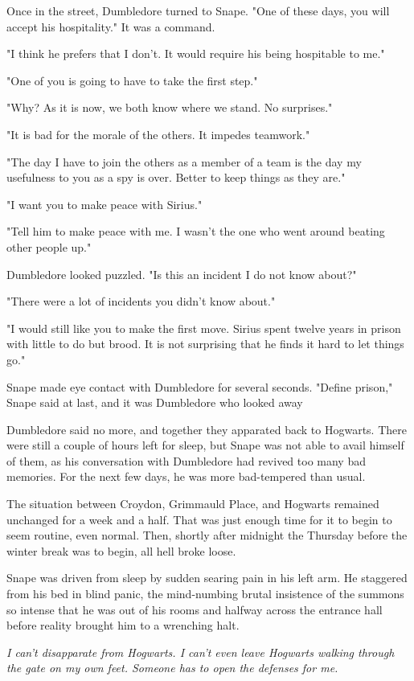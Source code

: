 Once in the street, Dumbledore turned to Snape. "One of these days, you will accept his hospitality." It was a command.

"I think he prefers that I don't. It would require his being hospitable to me."

"One of you is going to have to take the first step."

"Why? As it is now, we both know where we stand. No surprises."

"It is bad for the morale of the others. It impedes teamwork."

"The day I have to join the others as a member of a team is the day my usefulness to you as a spy is over. Better to keep things as they are."

"I want you to make peace with Sirius."

"Tell him to make peace with me. I wasn't the one who went around beating other people up."

Dumbledore looked puzzled. "Is this an incident I do not know about?"

"There were a lot of incidents you didn't know about."

"I would still like you to make the first move. Sirius spent twelve years in prison with little to do but brood. It is not surprising that he finds it hard to let things go."

Snape made eye contact with Dumbledore for several seconds. "Define prison," Snape said at last, and it was Dumbledore who looked away

Dumbledore said no more, and together they apparated back to Hogwarts. There were still a couple of hours left for sleep, but Snape was not able to avail himself of them, as his conversation with Dumbledore had revived too many bad memories. For the next few days, he was more bad-tempered than usual.

The situation between Croydon, Grimmauld Place, and Hogwarts remained unchanged for a week and a half. That was just enough time for it to begin to seem routine, even normal. Then, shortly after midnight the Thursday before the winter break was to begin, all hell broke loose.

Snape was driven from sleep by sudden searing pain in his left arm. He staggered from his bed in blind panic, the mind-numbing brutal insistence of the summons so intense that he was out of his rooms and halfway across the entrance hall before reality brought him to a wrenching halt.

\emph{I can't disapparate from Hogwarts. I can't even leave Hogwarts walking through the gate on my own feet. Someone has to open the defenses for me.}

